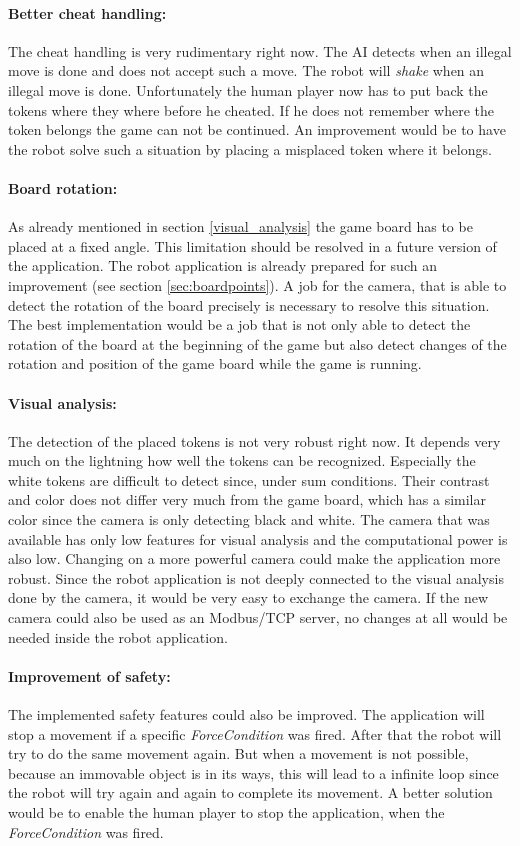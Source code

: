 \documentclass[a4paper]{spie}  %
\begin{document}
\begin{large}
\paragraph{Better cheat handling:} The cheat handling is very rudimentary right now. The AI detects when an illegal move is done and does not accept such a move. The robot will \emph{shake} when an illegal move is done. Unfortunately the human player now has to put back the tokens where they where before he cheated. If he does not remember where the token belongs the game can not be continued. An improvement would be to have the robot solve such a situation by placing a misplaced token where it belongs.
\paragraph{Board rotation:} As already mentioned in section \ref{visual_analysis} the game board has to be placed at a fixed angle. This limitation should be resolved in a future version of the application. The robot application is already prepared for such an improvement (see section \ref{sec:boardpoints}). A job for the camera, that is able to detect the rotation of the board precisely is necessary to resolve this situation. The best implementation would be a job that is not only able to detect the rotation of the board at the beginning of the game but also detect changes of the rotation and position of the game board while the game is running.   
\paragraph{Visual analysis:} The detection of the placed tokens is not very robust right now. It depends very much on the lightning how well the tokens can be recognized. Especially the white tokens are difficult to detect since, under sum conditions. Their contrast and color does not differ very much from the game board, which has a similar color since the camera is only detecting black and white. The camera that was available has only low features for visual analysis and the computational power is also low. Changing on a more powerful camera could make the application more robust. Since the robot application is not deeply connected to the visual analysis done by the camera, it would be very easy to exchange the camera. If the new camera could also be used as an Modbus/TCP server, no changes at all would be needed inside the robot application. 
\paragraph{Improvement of safety:} The implemented safety features could also be improved. The application will stop a movement if a specific \emph{ForceCondition} was fired. After that the robot will try to do the same movement again. But when a movement is not possible, because an immovable object is in its ways, this will lead to a infinite loop since the robot will try again and again to complete its movement. A better solution would be to enable the human player to stop the application, when the \emph{ForceCondition} was fired.

\end{large}
\end{document}

